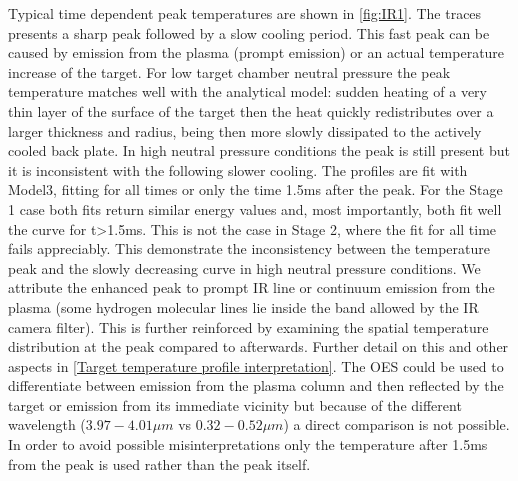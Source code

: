 Typical time dependent peak temperatures are shown in \autoref{fig:IR1}. The traces presents a sharp peak followed by a slow cooling period. This fast peak can be caused by emission from the plasma (prompt emission) or an actual temperature increase of the target. For low target chamber neutral pressure the peak temperature matches well with the analytical model: sudden heating of a very thin layer of the surface of the target then the heat quickly redistributes over a larger thickness and radius, being then more slowly dissipated to the actively cooled back plate.\cite{Li2020,Morgan2020} In high neutral pressure conditions the peak is still present but it is inconsistent with the following slower cooling. The profiles are fit with Model3, fitting for all times or only the time 1.5ms after the peak. For the Stage 1 case both fits return similar energy values and, most importantly, both fit well the curve for t>1.5ms. This is not the case in Stage 2, where the fit for all time fails appreciably. This demonstrate the inconsistency between the temperature peak and the slowly decreasing curve in high neutral pressure conditions. We attribute the enhanced peak to prompt IR line or continuum emission from the plasma (some hydrogen molecular lines lie inside the band allowed by the IR camera filter\cite{Sternberg1989}). This is further reinforced by examining the spatial temperature distribution at the peak compared to afterwards. Further detail on this and other aspects in \autoref{Target temperature profile interpretation}. The OES could be used to differentiate between emission from the plasma column and then reflected by the target or emission from its immediate vicinity but because of the different wavelength ($3.97-4.01\mu m$ vs $0.32-0.52\mu m$) a direct comparison is not possible. In order to avoid possible misinterpretations only the temperature after 1.5ms from the peak is used rather than the peak itself. 


